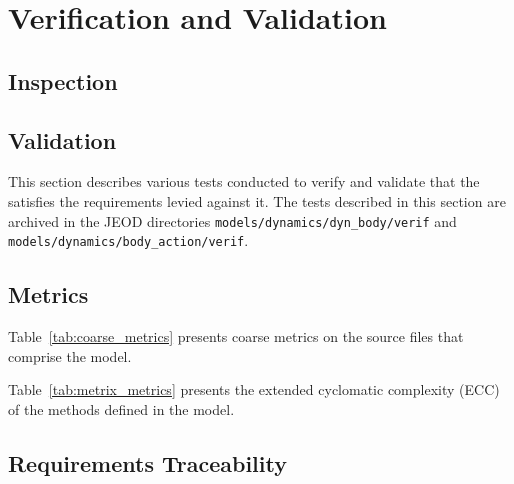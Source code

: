 \chapter{Verification and Validation}\label{ch:ivv}

\section{Inspection}\label{sec:inspect}


\section{Validation}
This section describes various tests conducted to verify and validate
that the \ModelDesc satisfies the requirements levied against it.
The tests described in this section
are archived in the JEOD directories
\verb+models/dynamics/dyn_body/verif+ and
\verb+models/dynamics/body_action/verif+.

\newpage

\clearpage
\newpage

\newpage

\newpage

\newpage


\newpage
\section{Metrics}
Table~\ref{tab:coarse_metrics} presents coarse metrics on the source
files that comprise the model.


Table~\ref{tab:metrix_metrics} presents the extended cyclomatic complexity (ECC)
of the methods defined in the model.



\newpage
\section{Requirements Traceability}

